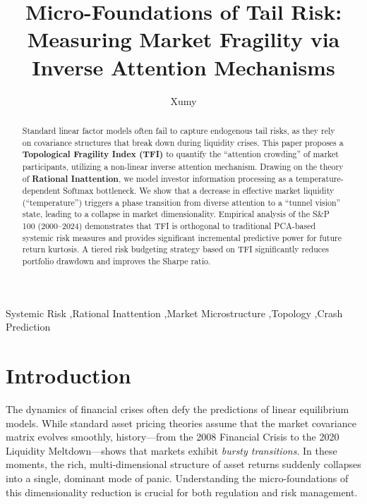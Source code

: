 \documentclass[preprint,12pt]{elsarticle}
\begin{document}
\begin{frontmatter}

\title{Micro-Foundations of Tail Risk: Measuring Market Fragility via Inverse Attention Mechanisms}

\author[inst1]{Xumy}

\begin{abstract}
Standard linear factor models often fail to capture endogenous tail risks, as they rely on covariance structures that break down during liquidity crises. This paper proposes a \textbf{Topological Fragility Index (TFI)} to quantify the ``attention crowding'' of market participants, utilizing a non-linear inverse attention mechanism. Drawing on the theory of \textbf{Rational Inattention}, we model investor information processing as a temperature-dependent Softmax bottleneck. We show that a decrease in effective market liquidity (``temperature'') triggers a phase transition from diverse attention to a ``tunnel vision'' state, leading to a collapse in market dimensionality. Empirical analysis of the S\&P 100 (2000--2024) demonstrates that TFI is orthogonal to traditional PCA-based systemic risk measures and provides significant incremental predictive power for future return kurtosis. A tiered risk budgeting strategy based on TFI significantly reduces portfolio drawdown and improves the Sharpe ratio.
\end{abstract}

\begin{keyword}
Systemic Risk \sep Rational Inattention \sep Market Microstructure \sep Topology \sep Crash Prediction
\end{keyword}

\end{frontmatter}

\section{Introduction}
The dynamics of financial crises often defy the predictions of linear equilibrium models. While standard asset pricing theories assume that the market covariance matrix evolves smoothly, history---from the 2008 Financial Crisis to the 2020 Liquidity Meltdown---shows that markets exhibit \textit{bursty transitions}. In these moments, the rich, multi-dimensional structure of asset returns suddenly collapses into a single, dominant mode of panic. Understanding the micro-foundations of this dimensionality reduction is crucial for both regulation and risk management.
\end{document}
